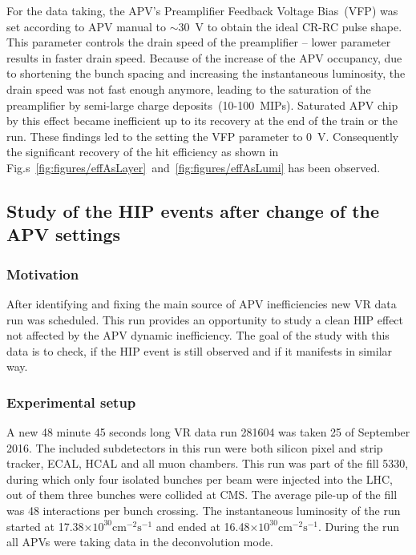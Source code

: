 For the data taking, the APV's Preamplifier Feedback Voltage Bias~(VFP) was set according to APV manual to $\sim$30~V to obtain the ideal CR-RC pulse shape. This parameter controls the drain speed of the preamplifier -- lower parameter results in faster drain speed. Because of the increase of the APV occupancy, due to shortening the bunch spacing and increasing the instantaneous luminosity, the drain speed was not fast enough anymore, leading to the saturation of the preamplifier by semi-large charge deposits~(10-100~MIPs). Saturated APV chip by this effect became inefficient up to its recovery at the end of the train or the run. These findings led to the setting the VFP parameter to 0~V. Consequently the significant recovery of the hit efficiency as shown in Fig.s~\ref{fig:figures/effAsLayer}~and~\ref{fig:figures/effAsLumi} has been observed.


\subsection{Study of the HIP events after change of the APV settings}

\subsubsection{Motivation}

After identifying and fixing the main source of APV inefficiencies new VR data run was scheduled. This run provides an opportunity to study a clean HIP effect not affected by the APV dynamic inefficiency. The goal of the study with this data is to check, if the HIP event is still observed and if it manifests in similar way.


\subsubsection{Experimental setup}

A new 48 minute 45 seconds long VR data run 281604 was taken 25 of September 2016. The included subdetectors in this run were both silicon pixel and strip tracker, ECAL, HCAL and all muon chambers. This run was part of the fill 5330, during which only four isolated bunches per beam were injected into the LHC, out of them three bunches were collided at CMS. The average pile-up of the fill was 48 interactions per bunch crossing. The instantaneous luminosity of the run started at 17.38$\times 10^{30} \mathrm{cm^{-2} s^{-1}}$ and ended at 16.48$\times 10^{30} \mathrm{cm^{-2} s^{-1}}$. During the run all APVs were taking data in the deconvolution mode. 

